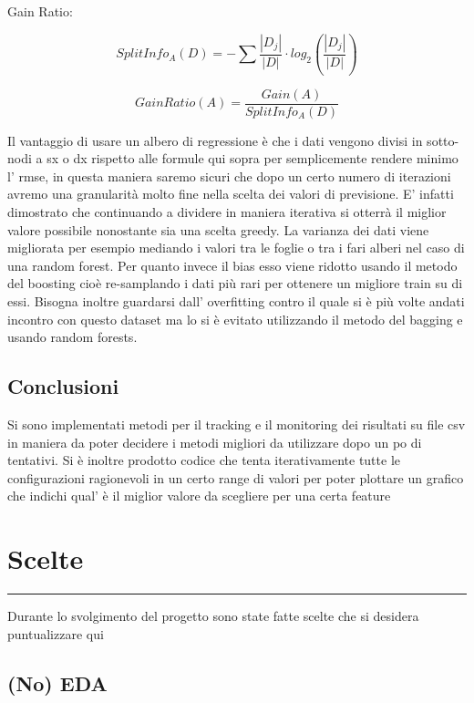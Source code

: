 \documentclass[11pt]{article}
\begin{document}
Gain Ratio:

\[SplitInfo_A(D) = -\sum \frac{|D_j|}{|D|}\cdot log_2(\frac{|D_j|}{|D|})\]

\[GainRatio(A) = \frac{Gain(A)}{SplitInfo_A(D)}\]

Il vantaggio di usare un albero di regressione è che i dati vengono
divisi in sotto-nodi a sx o dx rispetto alle formule qui sopra per
semplicemente rendere minimo l' rmse, in questa maniera saremo sicuri
che dopo un certo numero di iterazioni avremo una granularità molto fine
nella scelta dei valori di previsione. E' infatti dimostrato che
continuando a dividere in maniera iterativa si otterrà il miglior valore
possibile nonostante sia una scelta greedy. La varianza dei dati viene
migliorata per esempio mediando i valori tra le foglie o tra i fari
alberi nel caso di una random forest. Per quanto invece il bias esso
viene ridotto usando il metodo del boosting cioè re-samplando i dati più
rari per ottenere un migliore train su di essi. Bisogna inoltre
guardarsi dall' overfitting contro il quale si è più volte andati
incontro con questo dataset ma lo si è evitato utilizzando il metodo del
bagging e usando random forests.

\subsection{Conclusioni}\label{conclusioni}

Si sono implementati metodi per il tracking e il monitoring dei
risultati su file csv in maniera da poter decidere i metodi migliori da
utilizzare dopo un po di tentativi. Si è inoltre prodotto codice che
tenta iterativamente tutte le configurazioni ragionevoli in un certo
range di valori per poter plottare un grafico che indichi qual' è il
miglior valore da scegliere per una certa feature

    \section{Scelte}\label{scelte}

\begin{center}\rule{0.5\linewidth}{\linethickness}\end{center}

Durante lo svolgimento del progetto sono state fatte scelte che si
desidera puntualizzare qui

\subsection{(No) EDA}\label{no-eda}
\end{document}

